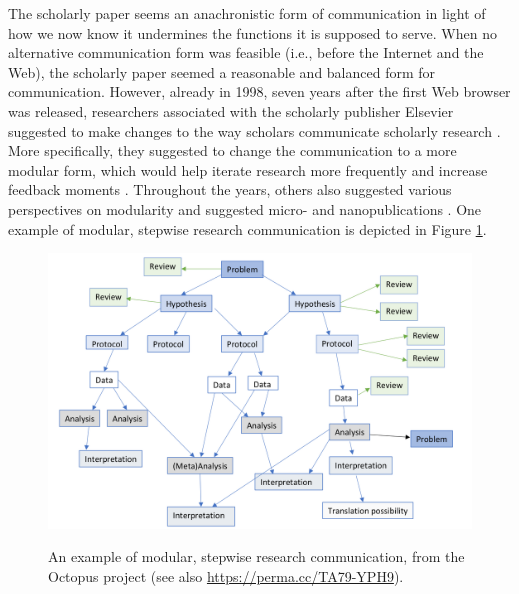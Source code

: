 \documentclass[publications,article,submit,moreauthors,pdftex,10pt,a4paper]{Definitions/mdpi}
\begin{document}
The scholarly paper seems an anachronistic form of communication in
light of how we now know it undermines the functions it is supposed to
serve. When no alternative communication form was feasible (i.e.,
before the Internet and the Web), the scholarly paper seemed a
reasonable and balanced form for communication. However, already in
1998, seven years after the first Web browser was released,
researchers associated with the scholarly publisher Elsevier suggested
to make changes to the way scholars communicate scholarly research
\citep{doi:10.1108/eum0000000007185}. More specifically, they
suggested to change the communication to a more modular form, which
would help iterate research more frequently and increase feedback
moments \citep[high speed of feedback was essential to for example
  Nature's rise during the early twentieth
  century;][]{isbn:9780226261454}. Throughout the years, others also
suggested various perspectives on modularity
\citep{doi:10.3389/fncom.2012.00019,doi:10.7717/peerj-cs.78} and
suggested micro- and nanopublications \citep{doi:10.7717/peerj-cs.78,
  doi:10.1186/2041-1480-5-28}. One example of modular, stepwise
research communication is depicted in Figure
\ref{fig:datcom-fig-octo}.

\begin{figure}
{\centering \includegraphics[width=1\linewidth]{fig-octo}}
\caption{An example of modular, stepwise research communication, from the Octopus project (see also \url{https://perma.cc/TA79-YPH9}).}
\label{fig:datcom-fig-octo}
\end{figure}
\end{document}
